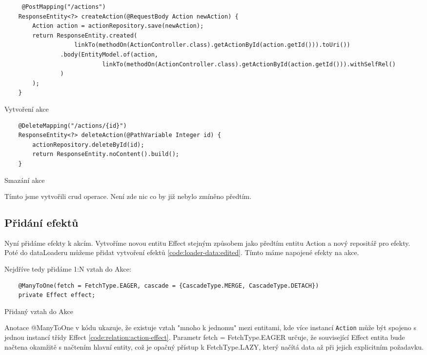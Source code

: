 \begin{listing}[H]
    \begin{verbatim}
     @PostMapping("/actions")
    ResponseEntity<?> createAction(@RequestBody Action newAction) {
        Action action = actionRepository.save(newAction);
        return ResponseEntity.created(
                    linkTo(methodOn(ActionController.class).getActionById(action.getId())).toUri())
                .body(EntityModel.of(action,
                            linkTo(methodOn(ActionController.class).getActionById(action.getId())).withSelfRel()
                )
        );
    }
    \end{verbatim}
    \caption{Vytvoření akce}
    \label{code:create-action}
\end{listing}


\begin{listing}[H]
    \begin{verbatim}
    @DeleteMapping("/actions/{id}")
    ResponseEntity<?> deleteAction(@PathVariable Integer id) {
        actionRepository.deleteById(id);
        return ResponseEntity.noContent().build();
    }
    \end{verbatim}
    \caption{Smazání akce}
    \label{code:delete-action}
\end{listing}


Tímto jsme vytvořili crud operace. Není zde nic co by již nebylo zmíněno předtím.

\subsection{Přidání efektů}
Nyní přidáme efekty k akcím. Vytvoříme novou entitu Effect stejným způsobem jako předtím entitu Action a nový repositář pro efekty. Poté do dataLoaderu můžeme přidat vytvoření efektů \ref{code:loader-data:edited}. Tímto máme napojené efekty na akce.

Nejdříve tedy přidáme 1:N vztah do Akce:

\begin{listing}[H]
    \begin{verbatim}
    @ManyToOne(fetch = FetchType.EAGER, cascade = {CascadeType.MERGE, CascadeType.DETACH})
    private Effect effect;
    \end{verbatim}
    \caption{Přidaný vztah do Akce}
    \label{code:relation:action-effect}
\end{listing}

Anotace @ManyToOne v kódu ukazuje, že existuje vztah "mnoho k jednomu" mezi entitami, kde více instancí \texttt{Action} může být spojeno s jednou instancí třídy Effect \ref{code:relation:action-effect}. Parametr fetch = FetchType.EAGER určuje, že související Effect entita bude načtena okamžitě s načtením hlavní entity, což je opačný přístup k FetchType.LAZY, který načítá data až při jejich explicitním požadavku.


